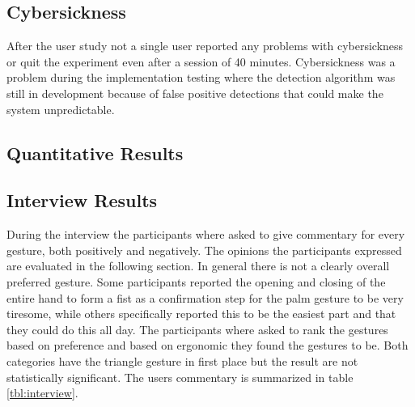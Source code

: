 



\subsection{Cybersickness}
After the user study not a single user reported any problems with cybersickness or quit the experiment even after a session of 40 minutes. Cybersickness was a problem during the implementation testing where the detection algorithm was still in development because of false positive detections that could make the system unpredictable.

\subsection{Quantitative Results}

\subsection{Interview Results}
During the interview the participants where asked to give commentary for every gesture, both positively and negatively. The opinions the participants expressed are evaluated in the following section. In general there is not a clearly overall preferred gesture. Some participants reported the opening and closing of the entire hand to form a fist as a confirmation step for the palm gesture to be very tiresome, while others specifically reported this to be the easiest part and that they could do this all day. The participants where asked to rank the gestures based on preference and based on ergonomic they found the gestures to be. Both categories have the triangle gesture in first place but the result are not statistically significant. The users commentary is summarized in table \ref{tbl:interview}. 

